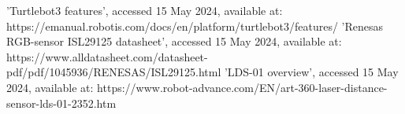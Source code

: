 \documentclass[conference]{IEEEtran}
\begin{document}
\begin{thebibliography}{00}
 'Turtlebot3 features', accessed 15 May 2024, available at: https://emanual.robotis.com/docs/en/platform/turtlebot3/features/
 'Renesas RGB-sensor ISL29125 datasheet', accessed 15 May 2024, available at: https://www.alldatasheet.com/datasheet-pdf/pdf/1045936/RENESAS/ISL29125.html
 'LDS-01 overview', accessed 15 May 2024, available at: https://www.robot-advance.com/EN/art-360-laser-distance-sensor-lds-01-2352.htm
\end{thebibliography}
\end{document}
